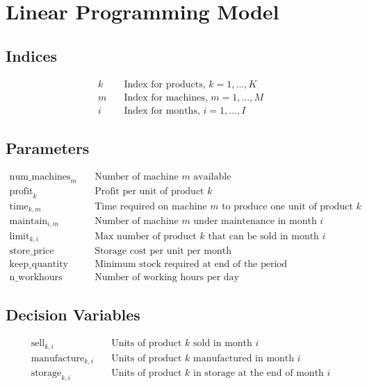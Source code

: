 \documentclass{article}
\begin{document}
\section*{Linear Programming Model}

\subsection*{Indices}
\begin{align*}
    k & \quad \text{Index for products, } k = 1, \ldots, K \\
    m & \quad \text{Index for machines, } m = 1, \ldots, M \\
    i & \quad \text{Index for months, } i = 1, \ldots, I
\end{align*}

\subsection*{Parameters}
\begin{align*}
    \text{num\_machines}_m & \quad \text{Number of machine } m \text{ available}\\
    \text{profit}_k & \quad \text{Profit per unit of product } k\\
    \text{time}_{k,m} & \quad \text{Time required on machine } m \text{ to produce one unit of product } k\\
    \text{maintain}_{i,m} & \quad \text{Number of machine } m \text{ under maintenance in month } i\\
    \text{limit}_{k,i} & \quad \text{Max number of product } k \text{ that can be sold in month } i\\
    \text{store\_price} & \quad \text{Storage cost per unit per month}\\
    \text{keep\_quantity} & \quad \text{Minimum stock required at end of the period}\\
    \text{n\_workhours} & \quad \text{Number of working hours per day}
\end{align*}

\subsection*{Decision Variables}
\begin{align*}
    \text{sell}_{k,i} & \quad \text{Units of product } k \text{ sold in month } i\\
    \text{manufacture}_{k,i} & \quad \text{Units of product } k \text{ manufactured in month } i\\
    \text{storage}_{k,i} & \quad \text{Units of product } k \text{ in storage at the end of month } i
\end{align*}
\end{document}
